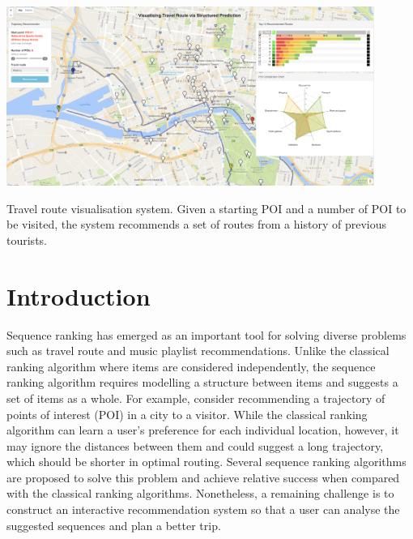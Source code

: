 \documentclass[sigconf]{acmart}
\begin{document}


 \begin{teaserfigure}
 \centering
   \includegraphics[width=0.9\textwidth]{figure/sample_map.png}
   \caption{Travel route visualisation system. Given a starting POI and a number of POI to be visited, the system recommends a set of routes from a history of previous tourists.}
   \label{fig:overview}
 \end{teaserfigure}

\maketitle


\section{Introduction}
Sequence ranking has emerged as an important tool for solving diverse problems such as travel route and music playlist recommendations. 
Unlike the classical ranking algorithm where items are considered independently, the sequence ranking algorithm requires modelling a structure between items and suggests a set of items as a whole. 
For example, consider recommending a trajectory of points of interest (POI) in a city to a visitor. 
While the classical ranking algorithm can learn a user's preference for each individual location, however, it may ignore the distances between them and could suggest a long trajectory, which should be shorter in optimal routing. 
Several sequence ranking algorithms are proposed to solve this problem and achieve relative success when compared with the classical ranking algorithms. 
Nonetheless, a remaining challenge is to construct an interactive recommendation system so that a user can analyse the suggested sequences and plan a better trip.
\end{document}
